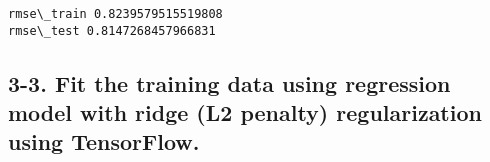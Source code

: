 \documentclass[11pt]{article}
\begin{document}
    \begin{Verbatim}[commandchars=\\\{\}]
rmse\_train 0.8239579515519808
rmse\_test 0.8147268457966831

    \end{Verbatim}

    \hypertarget{fit-the-training-data-using-regression-model-with-ridge-l2-penalty-regularization-using-tensorflow.}{%
\subsection{3-3. Fit the training data using regression model with ridge
(L2 penalty) regularization using
TensorFlow.}\label{fit-the-training-data-using-regression-model-with-ridge-l2-penalty-regularization-using-tensorflow.}}
\end{document}
